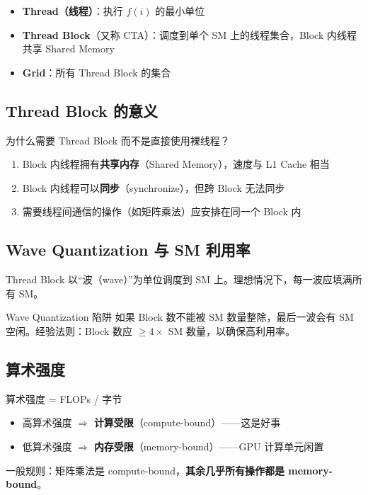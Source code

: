 \documentclass[a4paper]{article}
\begin{document}
\begin{itemize}
    \item \textbf{Thread（线程）}：执行 $f(i)$ 的最小单位
    \item \textbf{Thread Block}（又称 CTA）：调度到单个 SM 上的线程集合，Block 内线程共享 Shared Memory
    \item \textbf{Grid}：所有 Thread Block 的集合
\end{itemize}

\subsection{Thread Block 的意义}

为什么需要 Thread Block 而不是直接使用裸线程？
\begin{enumerate}
    \item Block 内线程拥有\textbf{共享内存}（Shared Memory），速度与 L1 Cache 相当
    \item Block 内线程可以\textbf{同步}（synchronize），但跨 Block 无法同步
    \item 需要线程间通信的操作（如矩阵乘法）应安排在同一个 Block 内
\end{enumerate}

\subsection{Wave Quantization 与 SM 利用率}

Thread Block 以``波（wave）''为单位调度到 SM 上。理想情况下，每一波应填满所有 SM。

\begin{warningbox}{Wave Quantization 陷阱}
如果 Block 数不能被 SM 数量整除，最后一波会有 SM 空闲。经验法则：Block 数应 $\geq 4 \times$ SM 数量，以确保高利用率。
\end{warningbox}

\subsection{算术强度}

\begin{importantbox}{算术强度 = FLOPs / 字节}
\begin{itemize}
    \item 高算术强度 $\Rightarrow$ \textbf{计算受限}（compute-bound）——这是好事
    \item 低算术强度 $\Rightarrow$ \textbf{内存受限}（memory-bound）——GPU 计算单元闲置
\end{itemize}
一般规则：矩阵乘法是 compute-bound，\textbf{其余几乎所有操作都是 memory-bound}。
\end{importantbox}
\end{document}
